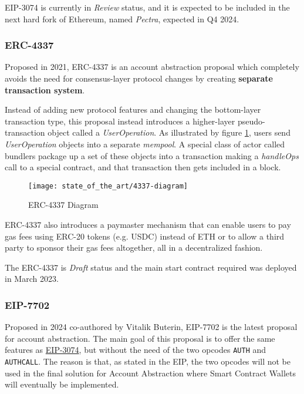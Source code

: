 EIP-3074 is currently in \textit{Review} status, and it is expected to be included in the next hard fork of Ethereum, named \textit{Pectra}, expected in Q4 2024. \cite{pectra-hardfork}

\subsubsection{ERC-4337}
\label{subsubsec:erc-4337}

Proposed in 2021, ERC-4337 is an account abstraction proposal which completely avoids the need for consensus-layer protocol changes by creating \textbf{separate transaction system}. \cite{eip-4337}

Instead of adding new protocol features and changing the bottom-layer transaction type, this proposal instead introduces a higher-layer pseudo-transaction object called a \textit{UserOperation}. 
As illustrated by figure \ref{fig:4337-diagram}, users send \textit{UserOperation} objects into a separate \textit{mempool}. A special class of actor called bundlers package up a set of these objects into a transaction making a \textit{handleOps} call to a special contract, and that transaction then gets included in a block. 

\begin{figure}[H]
    \centering
    \texttt{[image: state\_of\_the\_art/4337-diagram]}
    \caption{ERC-4337 Diagram}
    \label{fig:4337-diagram}
\end{figure}


ERC-4337 also introduces a paymaster mechanism that can enable users to pay gas fees using ERC-20 tokens (e.g. USDC) instead of ETH or to allow a third party to sponsor their gas fees altogether, all in a decentralized fashion. \cite{isin-aa-user-experience}

The ERC-4337 is \textit{Draft} status and the main start contract required was deployed in March 2023. \cite{ethereum-roadmap-ux}

\subsubsection{EIP-7702}

Proposed in 2024 co-authored by Vitalik Buterin, EIP-7702 is the latest proposal for account abstraction. The main goal of this proposal is to offer the same features as \hyperref[subsubsec:eip-3074]{EIP-3074}, but without the need of the two opcodes \texttt{AUTH} and \texttt{AUTHCALL}. The reason is that, as stated in the EIP, the two opcodes will not be used in the final solution for Account Abstraction where Smart Contract Wallets will eventually be implemented. \cite{eip-7702}

